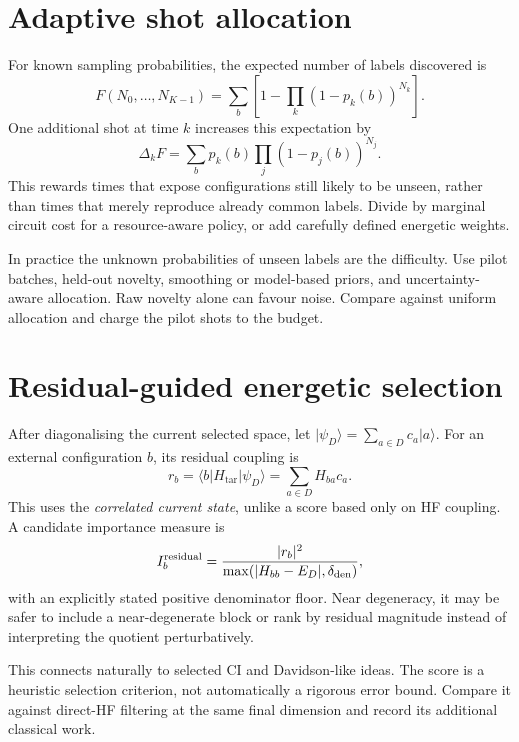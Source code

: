 \documentclass[11pt,a4paper,oneside]{report}
\newcommand{\ket}[1]{\lvert #1\rangle}
\newcommand{\bra}[1]{\langle #1\rvert}
\newcommand{\Ht}{H_{\mathrm{tar}}}
\begin{document}
\section{Adaptive shot allocation}
For known sampling probabilities, the expected number of labels discovered is
\begin{equation}
F(N_0,\ldots,N_{K-1})=\sum_b\left[1-\prod_k(1-p_k(b))^{N_k}\right].
\end{equation}
One additional shot at time $k$ increases this expectation by
\begin{equation}\label{eq:marginal}
\Delta_kF=\sum_b p_k(b)\prod_j(1-p_j(b))^{N_j}.
\end{equation}
This rewards times that expose configurations still likely to be unseen, rather than times that merely reproduce already common labels. Divide by marginal circuit cost for a resource-aware policy, or add carefully defined energetic weights.

In practice the unknown probabilities of unseen labels are the difficulty. Use pilot batches, held-out novelty, smoothing or model-based priors, and uncertainty-aware allocation. Raw novelty alone can favour noise. Compare against uniform allocation and charge the pilot shots to the budget.

\section{Residual-guided energetic selection}
After diagonalising the current selected space, let $\ket{\psi_D}=\sum_{a\in D}c_a\ket a$. For an external configuration $b$, its residual coupling is
\begin{equation}
r_b=\bra b\Ht\ket{\psi_D}=\sum_{a\in D}H_{ba}c_a.
\end{equation}
This uses the \emph{correlated current state}, unlike a score based only on HF coupling. A candidate importance measure is
\begin{equation}
I_b^{\rm residual}=\frac{|r_b|^2}{\max(|H_{bb}-E_D|,\delta_{\rm den})},
\end{equation}
with an explicitly stated positive denominator floor. Near degeneracy, it may be safer to include a near-degenerate block or rank by residual magnitude instead of interpreting the quotient perturbatively.

This connects naturally to selected CI and Davidson-like ideas. The score is a heuristic selection criterion, not automatically a rigorous error bound. Compare it against direct-HF filtering at the same final dimension and record its additional classical work.
\end{document}

